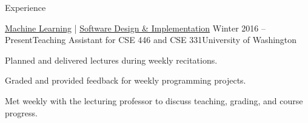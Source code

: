 \documentclass{resume} %
\begin{document}
\begin{rSection}{Experience}
  \begin{rSubsection}{\href{https://courses.cs.washington.edu/courses/cse446/17sp/}{Machine Learning} | \href{https://courses.cs.washington.edu/courses/cse331/16wi/}{Software Design \& Implementation}}
    {Winter 2016 -- Present}{Teaching Assistant for CSE 446 and CSE 331}{University of Washington}
  \item Planned and delivered lectures during weekly recitations.
  \item Graded and provided feedback for weekly programming projects.
  \item Met weekly with the lecturing professor to discuss teaching, grading, and course progress.
  \end{rSubsection}
  
\end{rSection}






\end{document}
